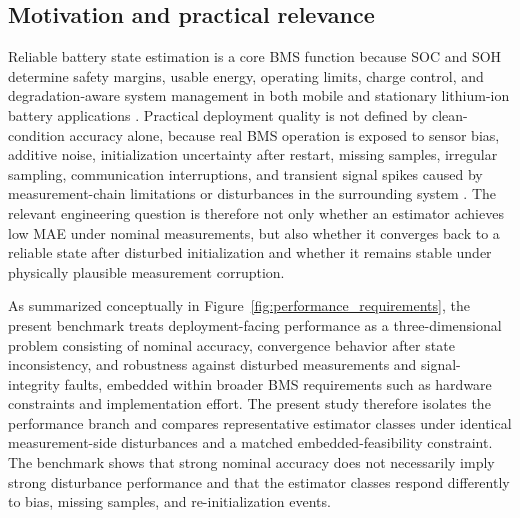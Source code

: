 \documentclass[review,nopreprintline]{elsarticle}
\begin{document}
\subsection{Motivation and practical relevance}
Reliable battery state estimation is a core BMS function because SOC and SOH determine safety margins, usable energy, operating limits, charge control, and degradation-aware system management in both mobile and stationary lithium-ion battery applications \cite{shrivastavaReviewTechnologicalAdvancement2023,guoSystematicReviewElectrochemical2024,yaoSmarterBatteryManagement2025b}. Practical deployment quality is not defined by clean-condition accuracy alone, because real BMS operation is exposed to sensor bias, additive noise, initialization uncertainty after restart, missing samples, irregular sampling, communication interruptions, and transient signal spikes caused by measurement-chain limitations or disturbances in the surrounding system \cite{liRobustnessSOCEstimation2015,naseriReliableWirelessBMS2025,bergerBenchmarkingBatteryManagement2024}. The relevant engineering question is therefore not only whether an estimator achieves low MAE under nominal measurements, but also whether it converges back to a reliable state after disturbed initialization and whether it remains stable under physically plausible measurement corruption.

As summarized conceptually in Figure~\ref{fig:performance_requirements}, the present benchmark treats deployment-facing performance as a three-dimensional problem consisting of nominal accuracy, convergence behavior after state inconsistency, and robustness against disturbed measurements and signal-integrity faults, embedded within broader BMS requirements such as hardware constraints and implementation effort. The present study therefore isolates the performance branch and compares representative estimator classes under identical measurement-side disturbances and a matched embedded-feasibility constraint. The benchmark shows that strong nominal accuracy does not necessarily imply strong disturbance performance and that the estimator classes respond differently to bias, missing samples, and re-initialization events.
\end{document}
